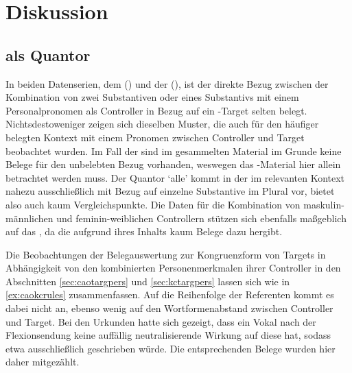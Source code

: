 \chapter{Diskussion}
\label{ch:diskussion}

\section{ als Quantor}

In beiden Datenserien, dem 
(\CAO{}) und der  (\KC{}), ist der direkte Bezug zwischen
der Kombination von zwei Substantiven oder eines Substantivs mit einem
Personalpronomen als Controller in Bezug auf ein -Target selten
belegt. Nichtsdestoweniger zeigen sich dieselben Muster, die auch für den
häufiger belegten Kontext mit einem Pronomen zwischen Controller und Target
beobachtet wurden. Im Fall der \KC{} sind im gesammelten Material im Grunde
keine Belege für den unbelebten Bezug vorhanden, weswegen das
\CAO{}-Material hier allein betrachtet werden muss. Der Quantor
 `alle' \autocite[vgl.][606--621]{ksw2} kommt in der \KC{}
im relevanten Kontext nahezu ausschließlich mit Bezug auf einzelne
Substan\-tive im Plural vor, bietet also auch kaum Vergleichspunkte. Die Daten
für die Kombination von maskulin-männlichen und feminin-weiblichen Controllern
stützen sich ebenfalls maßgeblich auf das \CAO{}, da die \KC{}
aufgrund ihres Inhalts kaum Belege dazu hergibt.

Die Beobachtungen der Belegauswertung zur Kongruenzform von Targets in
Abhängigkeit von den kombinierten Personenmerkmalen ihrer Controller in den
Abschnitten \ref{sec:caotargpers} und \ref{sec:kctargpers} lassen sich wie in
\cref{ex:caokcrules} zusammenfassen. Auf die Reihenfolge der Referenten kommt
es dabei nicht an, ebenso wenig auf den Wortformenabstand zwischen Controller
und Target. Bei den Urkunden hatte sich gezeigt, dass ein Vokal nach der
Flexionsendung  keine auffällig neutrali\-sie\-rende Wirkung auf
diese hat, sodass etwa ausschließlich  geschrieben würde. Die
entsprechenden Belege wurden hier daher mitgezählt.

